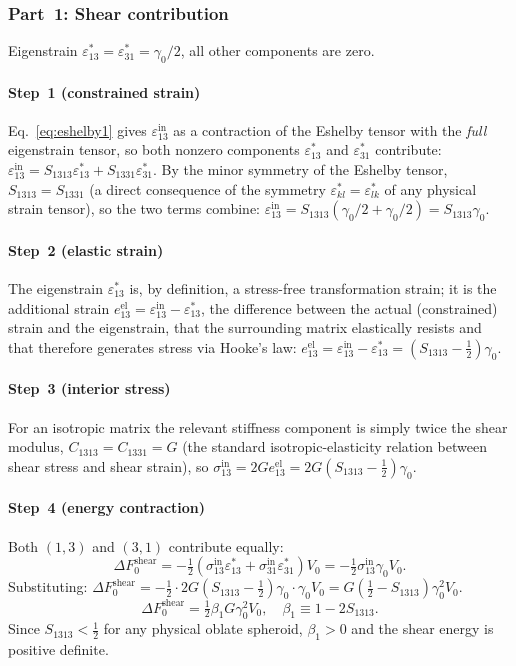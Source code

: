 \documentclass[3p]{elsarticle}
\newcommand{\dF}{\Delta F_0}
\newcommand{\gz}{\gamma_0}
\newcommand{\half}{\tfrac{1}{2}}
\begin{document}
\subsubsection{Part~1: Shear contribution}
\label{sec:Eshear}

Eigenstrain $\varepsilon^*_{13}=\varepsilon^*_{31}=\gz/2$, all other
components are zero.

\paragraph{Step~1 (constrained strain)}
Eq.~\eqref{eq:eshelby1} gives $\varepsilon_{13}^\mathrm{in}$ as a
contraction of the Eshelby tensor with the \emph{full} eigenstrain
tensor, so both nonzero components $\varepsilon^*_{13}$ and
$\varepsilon^*_{31}$ contribute:
$\varepsilon_{13}^\mathrm{in}=S_{1313}\varepsilon^*_{13}+S_{1331}\varepsilon^*_{31}$.
By the minor symmetry of the Eshelby tensor, $S_{1313}=S_{1331}$ (a
direct consequence of the symmetry $\varepsilon^*_{kl}=\varepsilon^*_{lk}$
of any physical strain tensor), so the two terms combine:
$\varepsilon_{13}^\mathrm{in}=S_{1313}(\gz/2+\gz/2)=S_{1313}\gz$.

\paragraph{Step~2 (elastic strain)}
The eigenstrain $\varepsilon^*_{13}$ is, by definition, a stress-free
transformation strain; it is the additional strain
$e_{13}^\mathrm{el}=\varepsilon_{13}^\mathrm{in}-\varepsilon^*_{13}$,
the difference between the actual (constrained) strain and the
eigenstrain, that the surrounding matrix elastically resists and
that therefore generates stress via Hooke's law:
$e_{13}^\mathrm{el}=\varepsilon_{13}^\mathrm{in}-\varepsilon^*_{13}
=(S_{1313}-\half)\gz$.

\paragraph{Step~3 (interior stress)}
For an isotropic matrix the relevant stiffness component is simply
twice the shear modulus, $C_{1313}=C_{1331}=G$ (the standard
isotropic-elasticity relation between shear stress and shear strain),
so
$\sigma_{13}^\mathrm{in}=2Ge_{13}^\mathrm{el}
=2G(S_{1313}-\half)\gz$.

\paragraph{Step~4 (energy contraction)}
Both $(1,3)$ and $(3,1)$ contribute equally:
\[
  \dF^\text{shear}=-\half(\sigma_{13}^\mathrm{in}\varepsilon^*_{13}
  +\sigma_{31}^\mathrm{in}\varepsilon^*_{31})V_0
  =-\half\sigma_{13}^\mathrm{in}\gz V_0.
\]
Substituting:
$\dF^\text{shear}=-\half\cdot2G(S_{1313}-\half)\gz\cdot\gz V_0
=G(\half-S_{1313})\gz^2 V_0$.
\begin{equation}
  \boxed{\dF^\text{shear}=\half\beta_1 G\gz^2 V_0,\quad
  \beta_1\equiv1-2S_{1313}.}
  \label{eq:Eshear}
\end{equation}
Since $S_{1313}<\half$ for any physical oblate spheroid,
$\beta_1>0$ and the shear energy is positive definite.
\end{document}
